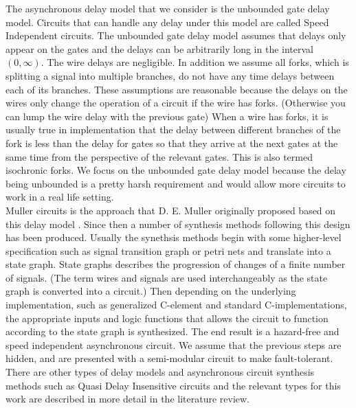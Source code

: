 \documentclass[12pt]{report}
\begin{document}
The asynchronous delay model that we consider is the unbounded gate delay model.  Circuits that can handle any delay under this model are called Speed Independent circuits. The unbounded gate delay model assumes that delays only appear on the gates and the delays can be arbitrarily long in the interval $(0,\infty)$.  The wire delays are negligible.  In addition we assume all forks, which is splitting a signal into multiple branches, do not have any time delays between each of its branches.  These assumptions are reasonable because the delays on the wires only change the operation of a circuit if the wire has forks.  (Otherwise you can lump the wire delay with the previous gate)  When a wire has forks, it is usually true in implementation that the delay between different branches of the fork is less than the delay for gates so that they arrive at the next gates at the same time from the perspective of the relevant gates.  This is also termed isochronic forks.  We focus on the unbounded gate delay model because the delay being unbounded is a pretty harsh requirement and would allow more circuits to work in a real life setting. \\ %

Muller circuits is the approach that D. E. Muller originally proposed based on this delay model \cite{Muller_59}.  Since then a number of synthesis methods following this design has been produced.  Usually the synethsis methods begin with some higher-level specification such as signal transition graph or petri nets and translate into a state graph.  State graphs describes the progression of changes of a finite number of signals.  (The term wires and signals are used interchangeably as the state graph is converted into a circuit.)  Then depending on the underlying implementation, such as generalized C-element and standard C-implementations, the appropriate inputs and logic functions that allows the circuit to function according to the state graph is synthesized.  The end result is a hazard-free and speed independent asynchronous circuit.  We assume that the previous steps are hidden, and are presented with a semi-modular circuit to make fault-tolerant.     
There are other types of delay models and asynchronous circuit synthesis methods such as Quasi Delay Insensitive circuits and the relevant types for this work are described in more detail in the literature review.  \\  %
\end{document}
